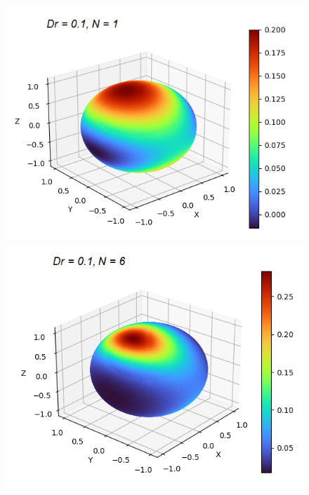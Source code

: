 \begin{frame}
	\scriptsize
	\begin{figure}[H]
		\centering
		\begin{minipage}{0.4\textwidth}
			\includegraphics[scale=0.4]{Bilder_wx/wx=1_Dr=0.1_N=1}
		\end{minipage}
		\hfill 
		\begin{minipage}{0.4\textwidth}
			\includegraphics[scale=0.4]{Bilder_wx/wx=1_Dr=0.1_N=6}
		\end{minipage}
	    \hfill 
	    \begin{minipage}{0.4\textwidth}

\end{minipage}
\end{figure}
\end{frame}
